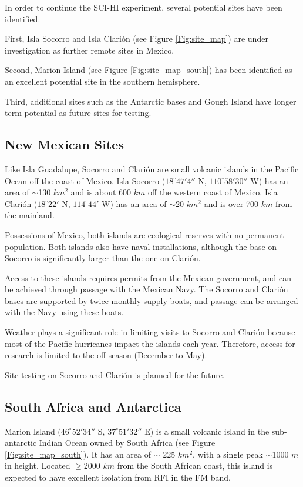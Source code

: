 In order to continue the SCI-HI experiment, several potential sites have been identified.

First, Isla Socorro and Isla Clari\'{o}n (see Figure \ref{Fig:site_map}) are under investigation as further remote sites in Mexico.

Second, Marion Island (see Figure \ref{Fig:site_map_south}) has been identified as an excellent potential site in the southern hemisphere.

Third, additional sites such as the Antarctic bases and Gough Island have longer term potential as future sites for testing. 

\subsection{New Mexican Sites}
Like Isla Guadalupe, Socorro and Clari\'{o}n are small volcanic islands in the Pacific Ocean off the coast of Mexico. Isla Socorro ($18^\circ 47' 4''$ N, $110^\circ 58' 30''$ W) has an area of $\sim$130 $km^2$ and is about 600 $km$ off the western coast of Mexico. Isla Clari\'{o}n ($18^\circ 22'$ N, $114^\circ 44'$ W) has an area of $\sim$20 $km^2$ and is over 700 $km$ from the mainland.

Possessions of Mexico, both islands are ecological reserves with no permanent population. Both islands also have naval installations, although the base on Socorro is significantly larger than the one on Clari\'{o}n. 

Access to these islands requires permits from the Mexican government, and can be achieved through passage with the Mexican Navy. The Socorro and Clari\'{o}n bases are supported by twice monthly supply boats, and passage can be arranged with the Navy using these boats. 

Weather plays a significant role in limiting visits to Socorro and Clari\'{o}n because most of the Pacific hurricanes impact the islands each year. Therefore, access for research is limited to the off-season (December to May). 

Site testing on Socorro and Clari\'{o}n is planned for the future.

\subsection{South Africa and Antarctica}
Marion Island ($46^\circ 52' 34''$ S, $37^\circ 51' 32''$ E) is a small volcanic island in the sub-antarctic Indian Ocean owned by South Africa (see Figure \ref{Fig:site_map_south}). It has an area of $\sim$ 225 $km^2$, with a single peak $\sim$1000 $m$ in height. Located $\geq$2000 $km$ from the South African coast, this island is expected to have excellent isolation from RFI in the FM band. 

